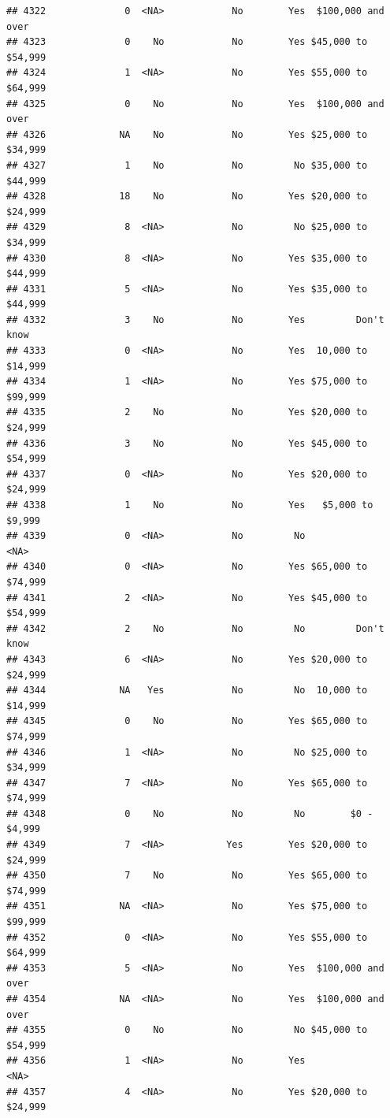 \documentclass[man]{apa6}
\begin{document}
\begin{verbatim}
## 4322              0  <NA>            No        Yes  $100,000 and over
## 4323              0    No            No        Yes $45,000 to $54,999
## 4324              1  <NA>            No        Yes $55,000 to $64,999
## 4325              0    No            No        Yes  $100,000 and over
## 4326             NA    No            No        Yes $25,000 to $34,999
## 4327              1    No            No         No $35,000 to $44,999
## 4328             18    No            No        Yes $20,000 to $24,999
## 4329              8  <NA>            No         No $25,000 to $34,999
## 4330              8  <NA>            No        Yes $35,000 to $44,999
## 4331              5  <NA>            No        Yes $35,000 to $44,999
## 4332              3    No            No        Yes         Don't know
## 4333              0  <NA>            No        Yes  10,000 to $14,999
## 4334              1  <NA>            No        Yes $75,000 to $99,999
## 4335              2    No            No        Yes $20,000 to $24,999
## 4336              3    No            No        Yes $45,000 to $54,999
## 4337              0  <NA>            No        Yes $20,000 to $24,999
## 4338              1    No            No        Yes   $5,000 to $9,999
## 4339              0  <NA>            No         No               <NA>
## 4340              0  <NA>            No        Yes $65,000 to $74,999
## 4341              2  <NA>            No        Yes $45,000 to $54,999
## 4342              2    No            No         No         Don't know
## 4343              6  <NA>            No        Yes $20,000 to $24,999
## 4344             NA   Yes            No         No  10,000 to $14,999
## 4345              0    No            No        Yes $65,000 to $74,999
## 4346              1  <NA>            No         No $25,000 to $34,999
## 4347              7  <NA>            No        Yes $65,000 to $74,999
## 4348              0    No            No         No        $0 - $4,999
## 4349              7  <NA>           Yes        Yes $20,000 to $24,999
## 4350              7    No            No        Yes $65,000 to $74,999
## 4351             NA  <NA>            No        Yes $75,000 to $99,999
## 4352              0  <NA>            No        Yes $55,000 to $64,999
## 4353              5  <NA>            No        Yes  $100,000 and over
## 4354             NA  <NA>            No        Yes  $100,000 and over
## 4355              0    No            No         No $45,000 to $54,999
## 4356              1  <NA>            No        Yes               <NA>
## 4357              4  <NA>            No        Yes $20,000 to $24,999

\end{verbatim}
\end{document}
